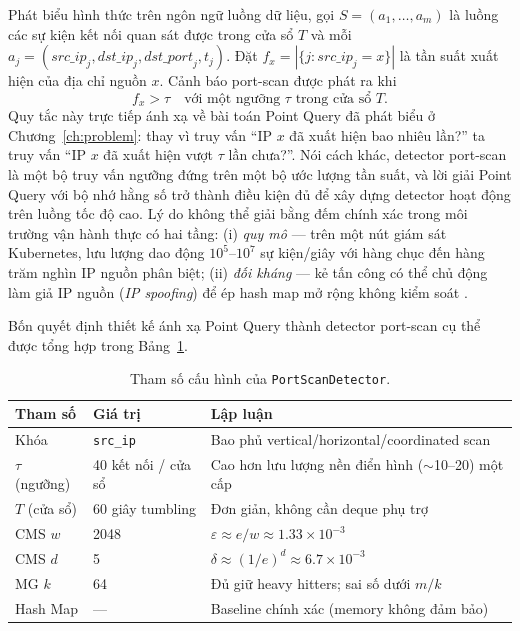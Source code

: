 Phát biểu hình thức trên ngôn ngữ luồng dữ liệu, gọi $S = (a_1, \ldots, a_m)$ là luồng các sự kiện kết nối quan sát được trong cửa sổ $T$ và mỗi $a_j = (\textit{src\_ip}_j, \textit{dst\_ip}_j, \textit{dst\_port}_j, t_j)$. Đặt $f_x = |\{j : \textit{src\_ip}_j = x\}|$ là tần suất xuất hiện của địa chỉ nguồn $x$. Cảnh báo port-scan được phát ra khi
\begin{equation}
  f_x > \tau \quad \text{với một ngưỡng } \tau \text{ trong cửa sổ } T.
  \label{eq:portscan-rule}
\end{equation}
Quy tắc này trực tiếp ánh xạ về bài toán Point Query đã phát biểu ở Chương~\ref{ch:problem}: thay vì truy vấn ``IP $x$ đã xuất hiện bao nhiêu lần?'' ta truy vấn ``IP $x$ đã xuất hiện vượt $\tau$ lần chưa?''. Nói cách khác, detector port-scan là một bộ truy vấn ngưỡng đứng trên một bộ ước lượng tần suất, và lời giải Point Query với bộ nhớ hằng số trở thành điều kiện đủ để xây dựng detector hoạt động trên luồng tốc độ cao. Lý do không thể giải bằng đếm chính xác trong môi trường vận hành thực có hai tầng: (i) \textit{quy mô} --- trên một nút giám sát Kubernetes, lưu lượng dao động $10^5$--$10^7$ sự kiện/giây với hàng chục đến hàng trăm nghìn IP nguồn phân biệt; (ii) \textit{đối kháng} --- kẻ tấn công có thể chủ động làm giả IP nguồn (\textit{IP spoofing}) để ép hash map mở rộng không kiểm soát \cite{crosby2003denial}.

Bốn quyết định thiết kế ánh xạ Point Query thành detector port-scan cụ thể được tổng hợp trong Bảng~\ref{tab:portscan-params}.

\begin{table}[H]
  \centering
  \caption{Tham số cấu hình của \texttt{PortScanDetector}.}
  \label{tab:portscan-params}
  \small
  \begin{tabular}{@{}l l l@{}}
    \toprule
    \textbf{Tham số} & \textbf{Giá trị} & \textbf{Lập luận} \\
    \midrule
    Khóa            & \texttt{src\_ip}             & Bao phủ vertical/horizontal/coordinated scan \\
    $\tau$ (ngưỡng)  & 40 kết nối / cửa sổ          & Cao hơn lưu lượng nền điển hình ($\sim$10--20) một cấp \\
    $T$ (cửa sổ)     & 60 giây tumbling             & Đơn giản, không cần deque phụ trợ \\
    CMS $w$          & 2048                         & $\varepsilon \approx e/w \approx 1.33 \times 10^{-3}$ \\
    CMS $d$          & 5                            & $\delta \approx (1/e)^d \approx 6.7 \times 10^{-3}$ \\
    MG $k$           & 64                           & Đủ giữ heavy hitters; sai số dưới $m/k$ \\
    Hash Map         & ---                          & Baseline chính xác (memory không đảm bảo) \\
    \bottomrule
  \end{tabular}
\end{table}

